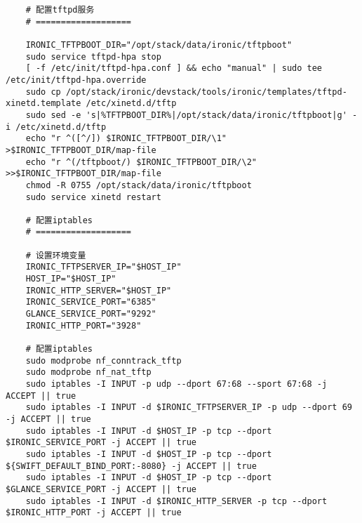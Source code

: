 \documentclass[a4paper,left=1.5cm,right=1.5cm,11pt]{article}
\begin{document}
\begin{lstlisting}
	# 配置tftpd服务
	# ===================

	IRONIC_TFTPBOOT_DIR="/opt/stack/data/ironic/tftpboot"
	sudo service tftpd-hpa stop
	[ -f /etc/init/tftpd-hpa.conf ] && echo "manual" | sudo tee /etc/init/tftpd-hpa.override
	sudo cp /opt/stack/ironic/devstack/tools/ironic/templates/tftpd-xinetd.template /etc/xinetd.d/tftp
	sudo sed -e 's|%TFTPBOOT_DIR%|/opt/stack/data/ironic/tftpboot|g' -i /etc/xinetd.d/tftp
	echo "r ^([^/]) $IRONIC_TFTPBOOT_DIR/\1" >$IRONIC_TFTPBOOT_DIR/map-file
	echo "r ^(/tftpboot/) $IRONIC_TFTPBOOT_DIR/\2" >>$IRONIC_TFTPBOOT_DIR/map-file
	chmod -R 0755 /opt/stack/data/ironic/tftpboot
	sudo service xinetd restart

	# 配置iptables
	# ===================

	# 设置环境变量
	IRONIC_TFTPSERVER_IP="$HOST_IP"
	HOST_IP="$HOST_IP"
	IRONIC_HTTP_SERVER="$HOST_IP"
	IRONIC_SERVICE_PORT="6385"
	GLANCE_SERVICE_PORT="9292"
	IRONIC_HTTP_PORT="3928"

	# 配置iptables
	sudo modprobe nf_conntrack_tftp
	sudo modprobe nf_nat_tftp
	sudo iptables -I INPUT -p udp --dport 67:68 --sport 67:68 -j ACCEPT || true
    sudo iptables -I INPUT -d $IRONIC_TFTPSERVER_IP -p udp --dport 69 -j ACCEPT || true
    sudo iptables -I INPUT -d $HOST_IP -p tcp --dport $IRONIC_SERVICE_PORT -j ACCEPT || true
	sudo iptables -I INPUT -d $HOST_IP -p tcp --dport ${SWIFT_DEFAULT_BIND_PORT:-8080} -j ACCEPT || true
	sudo iptables -I INPUT -d $HOST_IP -p tcp --dport $GLANCE_SERVICE_PORT -j ACCEPT || true
	sudo iptables -I INPUT -d $IRONIC_HTTP_SERVER -p tcp --dport $IRONIC_HTTP_PORT -j ACCEPT || true
	\end{lstlisting}
\end{document}
